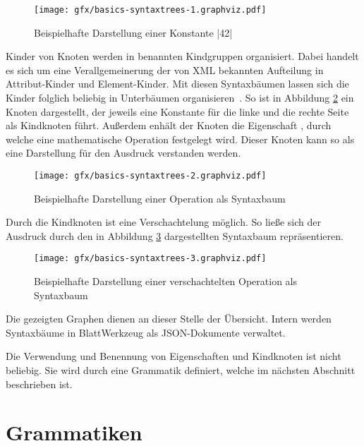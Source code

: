 \begin{figure}[h]
  \centering
  \texttt{[image: gfx/basics-syntaxtrees-1.graphviz.pdf]}
  \caption{Beispielhafte Darstellung einer Konstante \inlinec|42|}
  \label{fig:basics:syntaxtrees:1}
\end{figure}

Kinder von Knoten werden in benannten Kindgruppen organisiert. Dabei handelt es sich um eine Verallgemeinerung der von XML bekannten Aufteilung in At\-tri\-but-Kin\-der und Ele\-ment-Kin\-der. Mit diesen Syntaxbäumen lassen sich die Kinder folglich beliebig in Unterbäumen organisieren~\cite[4]{riemer2018}. So ist in Abbildung \ref{fig:basics:syntaxtrees:2} ein Knoten  dargestellt, der jeweils eine Konstante für die linke und die rechte Seite als Kindknoten führt. Außerdem enhält der Knoten die Eigenschaft , durch welche eine mathematische Operation festgelegt wird. Dieser Knoten kann so als eine Darstellung für den Ausdruck  verstanden werden.

\begin{figure}[h]
  \centering
  \texttt{[image: gfx/basics-syntaxtrees-2.graphviz.pdf]}
  \caption{Beispielhafte Darstellung einer Operation als Syntaxbaum}
  \label{fig:basics:syntaxtrees:2}
\end{figure}

Durch die Kindknoten ist eine Verschachtelung möglich. So ließe sich der Ausdruck  durch den in Abbildung \ref{fig:basics:syntaxtrees:3} dargestellten Syntaxbaum repräsentieren.

\begin{figure}[h]
  \centering
  \texttt{[image: gfx/basics-syntaxtrees-3.graphviz.pdf]}
  \caption{Beispielhafte Darstellung einer verschachtelten Operation als Syntaxbaum}
  \label{fig:basics:syntaxtrees:3}
\end{figure}

Die gezeigten Graphen dienen an dieser Stelle der Übersicht. Intern werden Syntaxbäume in BlattWerkzeug als JSON-Do\-ku\-mente verwaltet.

Die Verwendung und Benennung von Eigenschaften und Kindknoten ist nicht beliebig. Sie wird durch eine Grammatik definiert, welche im nächsten Abschnitt beschrieben ist.

\section{Grammatiken}
\label{sec:basics:grammars}

